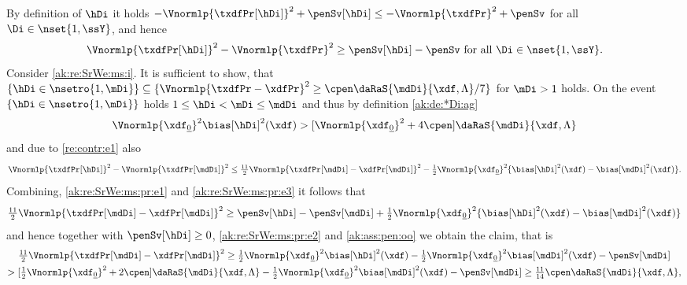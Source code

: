 \begin{pro}
  By definition of $\hDi$ it holds
  $-\Vnormlp{\txdfPr[\hDi]}^2+\penSv[\hDi]\leq
  -\Vnormlp{\txdfPr}^2+\penSv$ for all $\Di\in\nset{1,\ssY}$, and
  hence
  \begin{equation}\label{ak:re:SrWe:ms:pr:e1}
    \Vnormlp{\txdfPr[\hDi]}^2-\Vnormlp{\txdfPr}^2\geq
    \penSv[\hDi]-\penSv\text{ for all }\Di\in\nset{1,\ssY}.
  \end{equation}
  Consider \ref{ak:re:SrWe:ms:i}. It is sufficient to show, that
  $\{\hDi\in\nsetro{1,\mDi}\}\subseteq
  \{\Vnormlp{\txdfPr-\xdfPr}^2\geq\cpen\daRaS{\mdDi}{\xdf,\Lambda}/7\}$
  for $\mDi>1$ holds.  On the event $\{\hDi\in\nsetro{1,\mDi}\}$ holds
  $1\leq\hDi<\mDi\leq\mdDi$ and thus by definition
  \eqref{ak:de:*Di:ag}
  \begin{equation}\label{ak:re:SrWe:ms:pr:e2}
    \Vnormlp{\xdf_{\underline{0}}}^2\bias[\hDi]^2(\xdf)>
    [\Vnormlp{\xdf_{\underline{0}}}^2+4\cpen]\daRaS{\mdDi}{\xdf,\Lambda}
  \end{equation}
  and due to  \ref{re:contr:e1} also
  \begin{equation}\label{ak:re:SrWe:ms:pr:e3}
    \Vnormlp{\txdfPr[\hDi]}^2-\Vnormlp{\txdfPr[\mdDi]}^2\leq
    \tfrac{11}{2}\Vnormlp{\txdfPr[\mdDi]-\xdfPr[\mdDi]}^2
    -\tfrac{1}{2}\Vnormlp{\xdf_{\underline{0}}}^2\{\bias[\hDi]^2(\xdf)-\bias[\mdDi]^2(\xdf)\}.
  \end{equation}
  Combining, \eqref{ak:re:SrWe:ms:pr:e1} and
  \eqref{ak:re:SrWe:ms:pr:e3} it follows that
  \begin{multline*}
    \tfrac{11}{2}\Vnormlp{\txdfPr[\mdDi]-\xdfPr[\mdDi]}^2\geq
    \penSv[\hDi]-\penSv[\mdDi]
    +\tfrac{1}{2}\Vnormlp{\xdf_{\underline{0}}}^2\{\bias[\hDi]^2(\xdf)-\bias[\mdDi]^2(\xdf)\}\hfill
  \end{multline*}
  and hence together with $\penSv[\hDi]\geq0$, \eqref{ak:re:SrWe:ms:pr:e2}
  and \ref{ak:ass:pen:oo} we obtain the claim, that is
  \begin{multline*}
    \tfrac{11}{2}\Vnormlp{\txdfPr[\mdDi]-\xdfPr[\mdDi]}^2\geq
    \tfrac{1}{2}\Vnormlp{\xdf_{\underline{0}}}^2\bias[\hDi]^2(\xdf)-
    \tfrac{1}{2}\Vnormlp{\xdf_{\underline{0}}}^2\bias[\mdDi]^2(\xdf)
    -\penSv[\mdDi]\\
    >[\tfrac{1}{2}\Vnormlp{\xdf_{\underline{0}}}^2+2\cpen]\daRaS{\mdDi}{\xdf,\Lambda}
    -\tfrac{1}{2}\Vnormlp{\xdf_{\underline{0}}}^2\bias[\mdDi]^2(\xdf)-\penSv[\mdDi]
    \geq\tfrac{11}{14}\cpen\daRaS{\mdDi}{\xdf,\Lambda},
  \end{multline*}

\end{pro}
